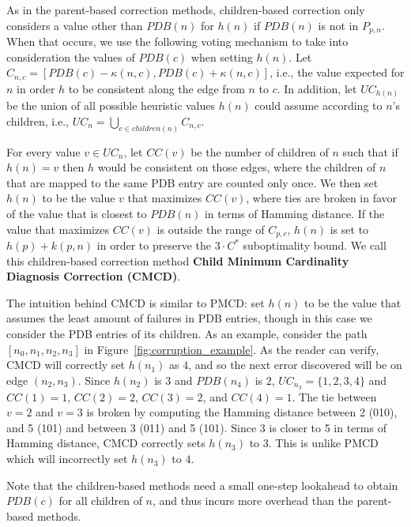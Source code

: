 \documentclass[letterpaper]{article}
\newtheorem{example}{Example}
\begin{document}
As in the parent-based correction methods, children-based correction only considers a value other than $PDB(n)$ for $h(n)$ if $PDB(n)$ is not in $P_{p,n}$. When that occurs, we use the following voting mechanism to take into consideration the values of $PDB(c)$ when setting $h(n)$. 
Let $C_{n,c}=[PDB(c)-\kappa(n,c),PDB(c)+\kappa(n,c)]$, i.e., the value expected for $n$ in order $h$ to be consistent along the edge from $n$ to $c$. In addition, let $UC_{h(n)}$ be the union of all possible heuristic values $h(n)$ could assume according to $n$'s children, i.e., $UC_n = \bigcup_{c \in children(n)} C_{n,c}$.

For every value $v\in UC_n$, let $CC(v)$ be the number of children of $n$ such that if $h(n)=v$ then $h$ would be consistent on those edges, where the children of $n$ that are mapped to the same PDB entry are counted only once. We then set $h(n)$ to be the value $v$ that maximizes $CC(v)$, where ties are broken in favor of the value that is closest to $PDB(n)$ in terms of Hamming distance.
If the value that maximizes $CC(v)$ is outside the range of $C_{p,c}$, $h(n)$ is set to $h(p) + k(p, n)$ in order to preserve the $3 \cdot C^*$ suboptimality bound.
We call this children-based correction method \textbf{Child Minimum Cardinality Diagnosis Correction (CMCD)}. 

The intuition behind CMCD is similar to PMCD: set $h(n)$ to be the value that assumes the least amount of failures in PDB entries, though in this case we consider the PDB entries of its children. 
As an example, consider the path $[n_0, n_1, n_2, n_3]$ in Figure~\ref{fig:corruption_example}.
As the reader can verify, CMCD will correctly set $h(n_1)$ as $4$, and so the next error discovered will be on edge $(n_2, n_3)$. 
Since $h(n_2)$ is $3$  and $PDB(n_4)$ is $2$, $UC_{n_3} = \{1, 2, 3, 4\}$ and $CC(1)=1$, $CC(2)=2$, $CC(3)=2$, and $CC(4)=1$.
The tie between $v=2$ and $v=3$ is broken by computing the Hamming distance between 2 (010), and 5 (101) and between 3 (011) and 5 (101). Since 3 is closer to 5 in terms of Hamming distance, CMCD correctly sets $h(n_3)$ to $3$.
This is unlike PMCD which will incorrectly set $h(n_3)$ to $4$.

Note that the children-based methods need a small one-step lookahead to obtain $PDB(c)$ for all children of $n$, and thus incurs more overhead than the parent-based methods. 
\end{document}
